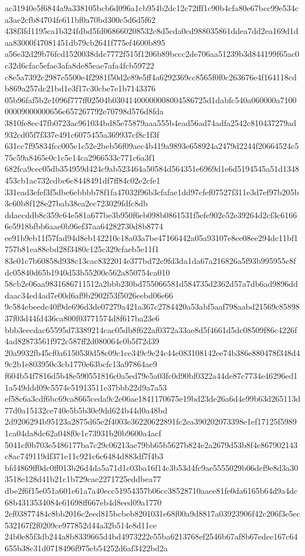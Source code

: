 \documentclass[11pt,a4paper]{article}
\begin{document}
{ac31940e5f6844a9a338105bcb6d096a1cb954b2dc12c72fff1c90b4cfa80e67bcc99e534ca3ae2cfb84704fe611bf0a70bd300c5d6d5f62
438f3fd1195ca1b324fdbd5fd068660208532c8d5cda0cd988035861ddea7dd2ea169d1daa83000f47081451db79cb2641f775ef4600b895
a56e32d29b76fcd1520038ddc7772f515f1206b89bccc2de706aa51239b3d844199f65ac0c32d6cfac5efae3afa8de85eae7afa4fcb59722
c8e5a7392c2987e5500e4f2981f50d2e89e5ff4a6292369cc8565f0f0c263676e4f164118cdb869a257dc21bd1e3f17c30cbe7e1b7143376
05b96faf5b2e1096f777ff02504b03041400000008004586725d1dabfc540a060000a710000009000000656e657267792e70798d576d8fda
3810fe8ec47fb0723ac961034bd85e75879aaa555b4ead56ad74adfa2542c810437279ad932cd05f7f337e491c6075455a369937cf8c1f3f
631cc7f95834fcc005e1c52e2beb56f09aec4b419a9893e658924a2479d2244f20664524c575c59a8465e0c1c5e14ca2966533c771c6a3f1
682fca9cec05db354959d424c9ab523464a50584d564351e6969d1e6d5194545a51d1348453cb1ac732cdbe6c8448491df7ff84c02e2cfe1
331ead3efef3f5dbe6ebbbb78f1fa47032f96b3cfafae1dd97cfef07527f311e3d7ef97b205b3c60b8f128e27bab38ea2ec723029fdfc8db
ddaecddb8c359c64e581a677be3b950f6eb098b0861531f5efe902e52e39264d2cf3c61666e5918bfbb6aae0b96ef37aa64282730d8b8774
ee91b9eb11f57fad94d8eb142210c18a03a7be47166442a05a93107e8ee08ee294dc11bf1757b81ea88ebd28f3480c125c329cfaeb5e11f1
83e01c7b60858d938c13cac8322014e377bd72c9fd3da1da67a216826a5f93b995955c8fdc05840d65b1940d53b55200e562a850754ca010
58cb2e06aa9831686711512a2bbb230bd755066581d584735d2362d57a7db6ad9896dddaac34ed4ad7e00d6af9b2902f53f5026eebd06e66
9c584ebeede40f9de696d3de07279a421a367c2784420a53abf5aaf798aabd21569c8589837f03d44fd436ca800f03771574d8f617ba23e6
bbb3eecdac65595d73389214cac05db8f622af0372a33ae8d5f4661d5dc08509f86c4226f4ad82873561f972c587ff2d080064c0b5f72d39
20a9932fb45cf0a6150530d58c09c1ce349c9e24c44e083108142ee74b386e880478f348d49c2b1e803950c3cb1770e63bcfc13a97864ae9
f604b54f7816d5b48e590551816c0a5ed79e5a03fc0d90bf0322a44de87c7734e46296ed11a549ddd09c5574e51913511e37bbb22d9a7a53
ef58c6a3cdf6bc69ca8665ceda9c2e06ae1841170675e19bd23de26a6d4e99b63d265113d77d0a15132ce740e5b5b30e9dd624b44d0a48bd
2d9206294b95123a2875d65e2f4003e36220622891fc2ea390202073398e1ef17125f59891ca04da8dc62a048f0e1c73931b20b9600a4acf
5041cf0b703e5486177ba7c29c06213ae79bb65b5627b824e2a2679d53b8f4c867902143c8ac749119df371e11c921c6c6484d883df7f4b3
bfd4869ff0dc0ff013b26d4da5a71d1c03ba16f14c3b53d4fc9ae5555029b06def9e8d3a303518e128d41b21c1b729cae2271725eddbea77
dbe2f6f15e051a601e61a7a40ecc51954357b06cc38528710aaee81fe0da6165b64d9a4dc68b4313534084e61698ff667eb4d8eed09a1770
2ef03877484c8bb2016c2eed815bcbeb8201031e68f00a9d8817a03923906f42c206f3e5ec532167f2f0209ce977852d44a32b514e8d11ce
24b0e85f3db244a8b8339665d4bd4973222e55ba6213768ef2546b67af8b67edee167c64655b38c31d0718496f975eb54252d6af3422bd2a
}
\end{document}
